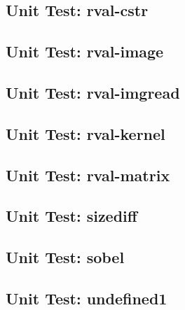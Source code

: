 \subsection*{Unit Test: rval-cstr}

 \clearpage
\subsection*{Unit Test: rval-image}

 \clearpage
\subsection*{Unit Test: rval-imgread}

 \clearpage
\subsection*{Unit Test: rval-kernel}

 \clearpage
\subsection*{Unit Test: rval-matrix}

 \clearpage
\subsection*{Unit Test: sizediff}

 \clearpage
\subsection*{Unit Test: sobel}

 \clearpage
\subsection*{Unit Test: undefined1}

 \clearpage
